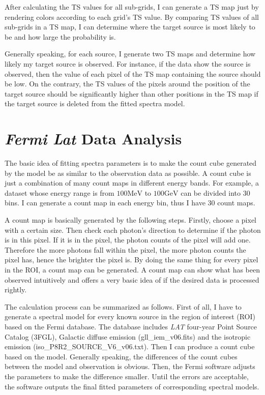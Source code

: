 \documentclass[12pt]{report}
\begin{document}
          After calculating the TS values for all sub-grids, I can generate a TS map just by 
          rendering colors according to each grid's TS value. By comparing TS values of 
          all sub-grids in a TS map, I can determine where the target source is most likely to 
          be and how large the probability is. 
          
          Generally speaking, for each source, I generate two TS maps and determine how likely 
          my target source is observed. For instance, if the data show the source is observed, 
          then the value of each pixel of the TS map containing the source should be low. 
          On the contrary, the TS values of the pixels around the position of the target 
          source should be significantly higher than other positions in the TS map if the target 
          source is deleted from the fitted spectra model.
       
        \section{\textit{Fermi Lat} Data Analysis}
          The basic idea of fitting spectra parameters is to make the count cube generated by 
          the model be as similar to the observation data as possible. A count cube is just a 
          combination of many count maps in different energy bands. For example, a dataset whose 
          energy range is from $100\mbox{MeV}$ to $100\mbox{GeV}$ can be divided into 30 bins. 
          I can generate a count map in each energy bin, thus I have 30 count maps.
          
          A count map is basically generated by the following steps. Firstly, choose a 
          pixel with a certain size. Then check each photon's direction to determine if 
          the photon is in this pixel. If it is in the pixel, the photon counts of the 
          pixel will add one. Therefore the more photons fall within the pixel, the more 
          photon counts the pixel has, hence the brighter the pixel is. By doing the same 
          thing for every pixel in the ROI, a count map can be generated. A count map can show 
          what has been observed intuitively and offers a very basic idea of if 
          the desired data is processed rightly.
          
          The calculation process can be summarized as follows. First of all, I have to generate 
          a spectral model for every known source in the region of interest (ROI) based on the Fermi 
          database. The database includes \textit{LAT} four-year Point Source Catalog (3FGL), 
          Galactic diffuse emission (gll\_iem\_v06.fits) and the isotropic emission 
          (iso\_P8R2\_SOURCE\_V6\_v06.txt). Then I can produce a count cube based on the 
          model. Generally speaking, the differences of the count cubes between the model and 
          observation is obvious. Then, the Fermi software adjusts the parameters 
          to make the difference smaller. Until the errors are acceptable, the software 
          outputs the final fitted parameters of corresponding spectral models.    
\end{document}
